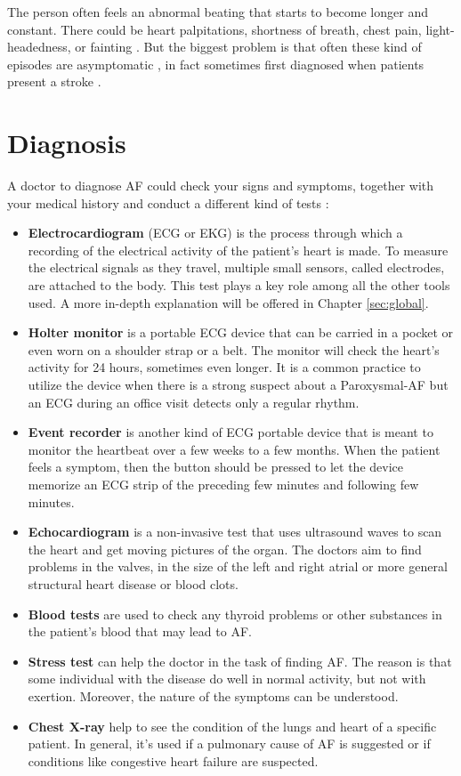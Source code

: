 The person often feels an abnormal beating that starts to become longer and constant. There could be heart palpitations, shortness of breath, chest pain,  light-headedness, or fainting \cite{chamberlain_gray_houghton_2010}. But the biggest problem is that often these kind of episodes are asymptomatic \cite{Munger2014}, in fact sometimes first diagnosed when patients present a stroke \cite{page2003asymptomatic}.

\section{Diagnosis}
A doctor to diagnose AF could check your signs and symptoms, together with your medical history and conduct a different kind of tests :
\begin{itemize}
\item \textbf{Electrocardiogram} (ECG or EKG) is the process through which a recording of the electrical activity of the patient's heart is made. To measure the electrical signals as they travel, multiple small sensors, called electrodes, are attached to the body. This test plays a key role among all the other tools used. A more in-depth explanation will be offered in Chapter \ref{sec:global}.
\item \textbf{Holter monitor} is a portable ECG device that can be carried in a pocket or even worn on a shoulder strap or a belt. The monitor will check the heart's activity for 24 hours, sometimes even longer. It is a common practice to utilize the device when there is a strong suspect about a Paroxysmal-AF but an ECG during an office visit detects only a regular rhythm.
\item \textbf{Event recorder} is another kind of ECG portable device that is meant to monitor the heartbeat over a few weeks to a few months. When the patient feels a symptom, then the button should be pressed to let the device memorize an ECG strip of the preceding few minutes and following few minutes.
\item \textbf{Echocardiogram} is a non-invasive test that uses ultrasound waves to scan the heart and get moving pictures of the organ. The doctors aim to find problems in the valves, in the size of the left and right atrial  or more general structural heart disease or blood clots.
\item \textbf{Blood tests} are used to check any thyroid problems or other substances in the patient's blood that may lead to AF.
\item \textbf{Stress test} can help the doctor in the task of finding AF. The reason is that some individual with the disease do well in normal activity, but not with exertion. Moreover, the nature of the symptoms can be understood.
\item \textbf{Chest X-ray} help to see the condition of the lungs and heart of a specific patient. In general, it's used if a pulmonary cause of AF is suggested or if conditions like congestive heart failure are suspected.
\end{itemize}

